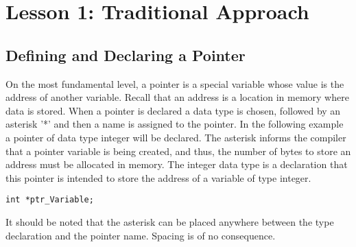 \documentclass[two column, 10pt]{article}
\begin{document}
\section{Lesson 1: Traditional Approach}
\subsection{Defining and Declaring a Pointer}
On the most fundamental level, a pointer is a special variable whose value is the address of another variable. Recall that an address is a location in memory where data is stored. When a pointer is declared a data type is chosen, followed by an asterisk '*' and then a name is assigned to the pointer. In the following example a pointer of data type integer will be declared. The asterisk informs the compiler that a pointer variable is being created, and thus, the number of bytes to store an address must be allocated in memory\cite{Kanetkar}. The integer data type is a declaration that this pointer is intended to store the address of a variable of type integer.
\begin{lstlisting}[style=CStyle,
caption={Declaring a Pointer Variable},captionpos=b]
int *ptr_Variable;
\end{lstlisting}
It should be noted that the asterisk can be placed anywhere between the type declaration and the pointer name. Spacing is of no consequence.
\end{document}
